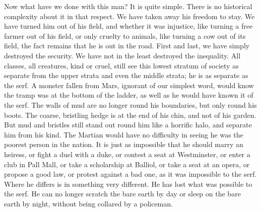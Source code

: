 \documentclass{book}
\begin{document}
Now what have we done with this man? It is quite simple. There is no historical complexity about it in that respect. We have taken away his freedom to stay. We have turned him out of his field, and whether it was injustice, like turning a free farmer out of his field, or only cruelty to animals, like turning a cow out of its field, the fact remains that he is out in the road. First and last, we have simply destroyed the security. We have not in the least destroyed the inequality. All classes, all creatures, kind or cruel, still see this lowest stratum of society as separate from the upper strata and even the middle strata; he is as separate as the serf. A monster fallen from Mars, ignorant of our simplest word, would know the tramp was at the bottom of the ladder, as well as he would have known it of the serf. The walls of mud are no longer round his boundaries, but only round his boots. The coarse, bristling hedge is at the end of his chin, and not of his garden. But mud and bristles still stand out round him like a horrific halo, and separate him from his kind. The Martian would have no difficulty in seeing he was the poorest person in the nation. It is just as impossible that he should marry an heiress, or fight a duel with a duke, or contest a seat at Westminster, or enter a club in Pall Mall, or take a scholarship at Balliol, or take a seat at an opera, or propose a good law, or protest against a bad one, as it was impossible to the serf. Where he differs is in something very different. He has lost what was possible to the serf. He can no longer scratch the bare earth by day or sleep on the bare earth by night, without being collared by a policeman.
\end{document}
